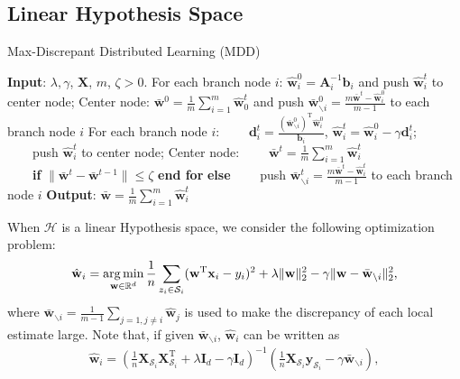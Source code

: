 \documentclass{article}
\newcommand{\argmin}{\operatornamewithlimits{arg\,min}}
\begin{document}
\subsection{Linear Hypothesis Space}
\begin{algorithm}[t]
    \caption{Max-Discrepant Distributed Learning (MDD)}
    \label{alg:RMMKL}
    \begin{algorithmic}[1]
    \STATE \textbf{Input}: $\lambda,\gamma$, $\mathbf X$, $m$, $\zeta>0$.
    \STATE For each branch node $i$:  $\hat{\mathbf w}_i^0=\mathbf A_i^{-1} \mathbf b_i$ and push $\hat{\mathbf w}_i^t$ to center node;
    \STATE Center node: $\bar{\mathbf w}^0=\frac{1}{m}\sum_{i=1}^m\hat{\mathbf w}_0^t$ and
    push $\bar{\mathbf w}^{0}_{\backslash i}=\frac{m\bar{\mathbf w}^{t}-\hat{\mathbf w}_i^0}{m-1}$ to each branch node $i$
    \STATE  For each branch node $i$:
    \STATE ~~~~$\mathbf d_i^t=\frac{\left(\bar{\mathbf w}^0_{\backslash i}\right)^\mathrm{T}\hat{\mathbf w}_i^0}{\mathbf b_i}$,
     $\hat{\mathbf w}_i^t=\hat{\mathbf w}_i^0-\gamma\mathbf d_i^t$;
    \STATE ~~~~push $\hat{\mathbf w}_i^t$ to center node;
     \STATE Center node:
     \STATE ~~~~$\bar{\mathbf w}^t=\frac{1}{m}\sum_{i=1}^m\hat{\mathbf w}_i^t$\\
      ~~~~\textbf{if} {$\|\bar{\mathbf w}^{t}-\bar{\mathbf w}^{t-1}\|\leq \zeta$} \textbf{end for}
      \STATE \textbf{else}
      \STATE ~~~~push $\bar{\mathbf w}^{t}_{\backslash i}=\frac{m\bar{\mathbf w}^{t}-\hat{\mathbf w}_i^t}{m-1}$ to each branch node $i$
    \ENDFOR
    \STATE \textbf{Output}: $\bar{\mathbf w}=\frac{1}{m}\sum_{i=1}^m\hat{\mathbf w}_i^t$
    \end{algorithmic}
\end{algorithm}
When $\mathcal{H}$ is a linear Hypothesis space,
we consider the following optimization problem:
\begin{align}
 \label{optimation-linear-space}
  \hat{\mathbf w}_i=\argmin_{\mathbf w\in\mathbb{R}^d}
  \frac{1}{n}\sum_{z_i\in\mathcal{S}_i}(\mathbf w^\mathrm{T}\mathbf x_i-y_i)^2+\lambda \|\mathbf w\|_2^2-\gamma \|\mathbf w-\bar{\mathbf w}_{\backslash i}\|_2^2,
\end{align}
where $\bar{\mathbf w}_{\backslash i}=\frac{1}{m-1}\sum_{j=1,j\not =i}\hat{\mathbf w}_j$
is used to make the discrepancy of each local estimate large.
Note that, if given $\bar{\mathbf w}_{\backslash i}$,  $\hat{\mathbf w}_i$ can be written as
\begin{align*}
  \hat{\mathbf w}_i=\left(\frac{1}{n}\mathbf X_{\mathcal{S}_i}\mathbf X_{\mathcal{S}_i}^\mathrm{T}+\lambda \mathbf I_d-\gamma \mathbf I_d\right)^{-1}
  \left(\frac{1}{n}\mathbf X_{\mathcal{S}_i}\mathbf y_{\mathcal{S}_i}-\gamma \bar{\mathbf w}_{\backslash i}\right),
\end{align*}
\end{document}
